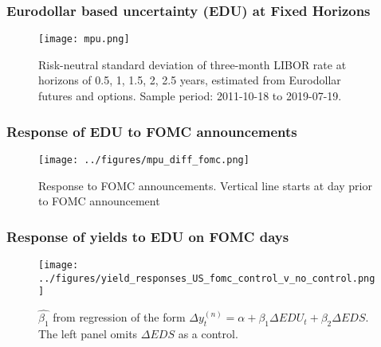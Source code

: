 \documentclass{beamer}
\begin{document}
\begin{frame}
\frametitle{Eurodollar based uncertainty (EDU) at Fixed Horizons}
\begin{figure}
	\centering
	\texttt{[image: mpu.png]}
	\caption{Risk-neutral standard deviation of three-month LIBOR rate at horizons of 0.5, 1, 1.5, 2, 2.5 years, estimated from Eurodollar futures and options. Sample period: 2011-10-18 to 2019-07-19.}
\end{figure}

\end{frame}

\begin{frame}
\frametitle{Response of EDU to FOMC announcements}
\begin{figure}
	\centering
	\texttt{[image: ../figures/mpu\_diff\_fomc.png]}
	\caption{Response to FOMC announcements. Vertical line starts at day prior to FOMC announcement}
\end{figure}
\end{frame}


\begin{frame}
\frametitle{Response of yields to EDU on FOMC days}
\begin{figure}
	\centering
	\texttt{[image: ../figures/yield\_responses\_US\_fomc\_control\_v\_no\_control.png]}
	\caption{$\hat{\beta_{1}}$ from regression of the form $\Delta y_{t}^{(n)} = \alpha + \beta_{1} \Delta EDU_{t} + \beta_{2} \Delta EDS$. The left panel omits $\Delta EDS$ as a control. }
\end{figure}

\end{frame}
\end{document}
